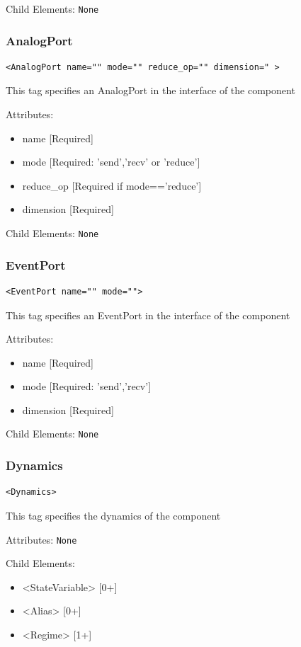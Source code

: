 \documentclass{article}
\begin{document}
Child Elements: \texttt{None}

\subsubsection{AnalogPort}
%
\begin{lstlisting}
<AnalogPort name="" mode="" reduce_op="" dimension=" >
\end{lstlisting}

This tag specifies an AnalogPort in the interface of the component

Attributes:
%
\begin{itemize}
\item name {[}Required{]}
\item mode {[}Required: 'send','recv' or 'reduce'{]}
\item reduce\_op {[}Required if mode=='reduce'{]}
\item dimension {[}Required{]}
\end{itemize}

Child Elements: \texttt{None}

\subsubsection{EventPort}
%
\begin{lstlisting}
<EventPort name="" mode="">
\end{lstlisting}

This tag specifies an EventPort in the interface of the component

Attributes:
%
\begin{itemize}
\item name {[}Required{]}
\item mode {[}Required: 'send','recv'{]}
\item dimension {[}Required{]}
\end{itemize}

Child Elements: \texttt{None}

\subsubsection{Dynamics}
%
\begin{lstlisting}
<Dynamics>
\end{lstlisting}

This tag specifies the dynamics of the component

Attributes: \texttt{None}

Child Elements:
%
\begin{itemize}
\item <StateVariable> {[}0+{]}
\item <Alias> {[}0+{]}
\item <Regime> {[}1+{]}
\end{itemize}
\end{document}
